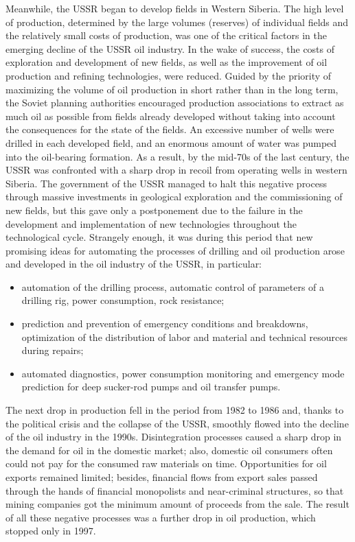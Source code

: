 \documentclass[12pt]{report}
\theoremstyle{definition}
\providecommand{\tightlist}{%
	\setlength{\itemsep}{0pt}\setlength{\parskip}{0pt}}
\begin{document}
Meanwhile, the USSR began to develop fields in Western Siberia.
The high level of production, determined by the large volumes (reserves) of individual fields and the relatively small costs of production, was one of the critical factors in the emerging decline of the USSR oil industry.
In the wake of success, the costs of exploration and development of new fields, as well as the improvement of oil production and refining technologies, were reduced.
Guided by the priority of maximizing the volume of oil production in short rather than in the long term, the Soviet planning authorities encouraged production associations to extract as much oil as possible from fields already developed without taking into account the consequences for the state of the fields.
An excessive number of wells were drilled in each developed field, and an enormous amount of water was pumped into the oil-bearing formation.
As a result, by the mid-70s of the last century, the USSR was confronted with a sharp drop in recoil from operating wells in western Siberia.
The government of the USSR managed to halt this negative process through massive investments in geological exploration and the commissioning of new fields, but this gave only a postponement due to the failure in the development and implementation of new technologies throughout the technological cycle.
Strangely enough, it was during this period that new promising ideas for automating the processes of drilling and oil production arose and developed in the oil industry of the USSR, in particular:

\begin{itemize} 
	\tightlist 
	\item automation of the drilling process, automatic control of parameters of a drilling rig, power consumption, rock resistance;
	\item prediction and prevention of emergency conditions and breakdowns, optimization of the distribution of labor and material and technical resources during repairs;
	\item automated diagnostics, power consumption monitoring and emergency mode prediction for deep sucker-rod pumps and oil transfer pumps.
\end{itemize}	

The next drop in production fell in the period from 1982 to 1986 and, thanks to the political crisis and the collapse of the USSR, smoothly flowed into the decline of the oil industry in the 1990s.
Disintegration processes caused a sharp drop in the demand for oil in the domestic market; also, domestic oil consumers often could not pay for the consumed raw materials on time.
Opportunities for oil exports remained limited; besides, financial flows from export sales passed through the hands of financial monopolists and near-criminal structures, so that mining companies got the minimum amount of proceeds from the sale.
The result of all these negative processes was a further drop in oil production, which stopped only in 1997.
\end{document}
